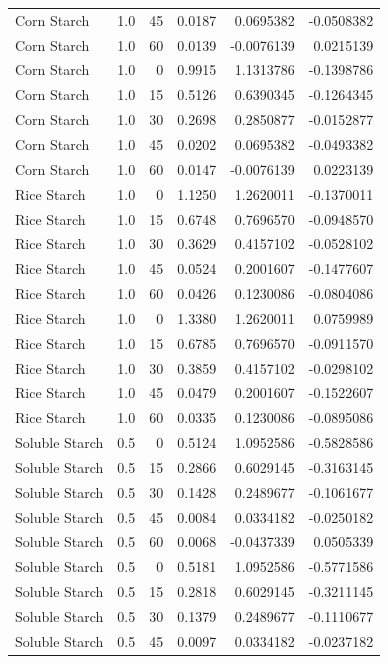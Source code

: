 \documentclass[
  12pt,
]{article}
\begin{document}
{\begin{longtable}[]{@{}lrrrrr@{}}
Corn Starch & 1.0 & 45 & 0.0187 & 0.0695382 & -0.0508382 \\
Corn Starch & 1.0 & 60 & 0.0139 & -0.0076139 & 0.0215139 \\
Corn Starch & 1.0 & 0 & 0.9915 & 1.1313786 & -0.1398786 \\
Corn Starch & 1.0 & 15 & 0.5126 & 0.6390345 & -0.1264345 \\
Corn Starch & 1.0 & 30 & 0.2698 & 0.2850877 & -0.0152877 \\
Corn Starch & 1.0 & 45 & 0.0202 & 0.0695382 & -0.0493382 \\
Corn Starch & 1.0 & 60 & 0.0147 & -0.0076139 & 0.0223139 \\
Rice Starch & 1.0 & 0 & 1.1250 & 1.2620011 & -0.1370011 \\
Rice Starch & 1.0 & 15 & 0.6748 & 0.7696570 & -0.0948570 \\
Rice Starch & 1.0 & 30 & 0.3629 & 0.4157102 & -0.0528102 \\
Rice Starch & 1.0 & 45 & 0.0524 & 0.2001607 & -0.1477607 \\
Rice Starch & 1.0 & 60 & 0.0426 & 0.1230086 & -0.0804086 \\
Rice Starch & 1.0 & 0 & 1.3380 & 1.2620011 & 0.0759989 \\
Rice Starch & 1.0 & 15 & 0.6785 & 0.7696570 & -0.0911570 \\
Rice Starch & 1.0 & 30 & 0.3859 & 0.4157102 & -0.0298102 \\
Rice Starch & 1.0 & 45 & 0.0479 & 0.2001607 & -0.1522607 \\
Rice Starch & 1.0 & 60 & 0.0335 & 0.1230086 & -0.0895086 \\
Soluble Starch & 0.5 & 0 & 0.5124 & 1.0952586 & -0.5828586 \\
Soluble Starch & 0.5 & 15 & 0.2866 & 0.6029145 & -0.3163145 \\
Soluble Starch & 0.5 & 30 & 0.1428 & 0.2489677 & -0.1061677 \\
Soluble Starch & 0.5 & 45 & 0.0084 & 0.0334182 & -0.0250182 \\
Soluble Starch & 0.5 & 60 & 0.0068 & -0.0437339 & 0.0505339 \\
Soluble Starch & 0.5 & 0 & 0.5181 & 1.0952586 & -0.5771586 \\
Soluble Starch & 0.5 & 15 & 0.2818 & 0.6029145 & -0.3211145 \\
Soluble Starch & 0.5 & 30 & 0.1379 & 0.2489677 & -0.1110677 \\
Soluble Starch & 0.5 & 45 & 0.0097 & 0.0334182 & -0.0237182 \\

\end{longtable}}
\end{document}
